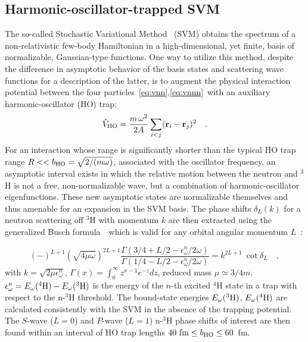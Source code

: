 \documentclass[5p,times]{elsarticle}
\begin{document}
\subsection{Harmonic-oscillator-trapped SVM}
The so-called Stochastic Variational Method~\cite{Suzuki:1998bn} (SVM) obtains the spectrum of a
non-relativistic few-body Hamiltonian in a high-dimensional, yet finite, basis of normalizable,
Gaussian-type functions. One way to utilize this method, despite the difference in asymptotic
behavior of the basis states and scattering wave functions for a description of the latter, is to
augment the physical interaction potential between the four particles~\eqref{eq:vnn},\eqref{eq:vnnn}~with
an auxiliary harmonic-oscillator (HO) trap:
%
\begin{equation}
    \hat{V}_{\rm HO} = \frac{m\,\omega^2}{2A} \sum_{i<j} (\textbf{r}_i - \textbf{r}_j)^2
\quad.
\end{equation}
%
For an interaction whose range is significantly shorter than the typical HO trap range $R << b_{\rm HO} =\sqrt{2/(m \omega)}$,
associated with the oscillator frequency, an asymptotic interval exists in which the relative motion between
the neutron and $^3$H is not a free, non-normalizable wave, but a combination of harmonic-oscillator eigenfunctions.
These new asymptotic states are normalizable themselves and thus amenable for an expansion in the SVM basis.
The phase shifts $\delta_L(k)$ for a neutron scattering off $^3$H with momentum $k$ are then extracted
using the generalized Busch formula~\cite{busch1998two}~which is valid for any orbital angular momentum $L$~\cite{Suzuki:2009}:    

\begin{equation}
    (-)^{L+1} \left(\sqrt{4\mu \omega}\right)^{2L+1} \frac{\Gamma\left(3/4 + L/2 - \epsilon^n_\omega/2\omega\right)}{\Gamma\left(1/4 - L/2 - \epsilon^n_\omega/2\omega\right)} = k^{2L+1}~\cot\delta_L
    \quad,
\end{equation}
with $k=\sqrt{2\mu \epsilon^n_\omega}$, $\Gamma(x)=\int_0^\infty z^{x-1}e^{-z}dz$, reduced mass $\mu \simeq 3/4 m$.
$\epsilon^n_\omega = E_\omega (^4{\rm H})-E_\omega (^3{\rm H})$ is the energy of the $n$-th excited $^4$H state in a trap
with respect to the n-$^3$H threshold. The bound-state energies $E_\omega (^3{\rm H})$, $E_\omega (^4{\rm H})$ are
calculated consistently with the SVM in the absence of the trapping potential.
The $S$-wave ($L=0$) and $P$-wave ($L=1$) n-$^3$H phase shifts of interest are then found within an interval of HO trap lengths
$40~{\rm fm} \leq b_{\rm HO} \leq 60$~fm.        
\end{document}

